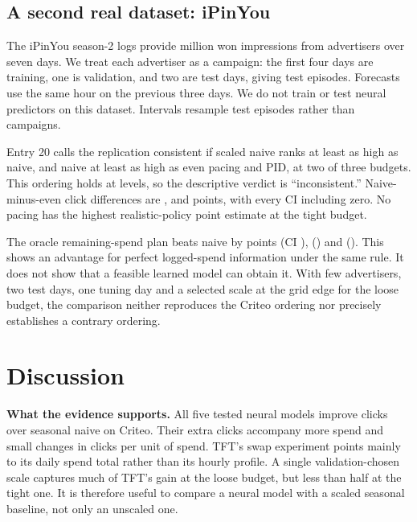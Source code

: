 \documentclass[sigconf,nonacm]{acmart}
\begin{document}
\subsection{A second real dataset: iPinYou}\label{sec:ipinyou}
The iPinYou season-2 logs provide  million won impressions
from  advertisers over seven days. We treat each advertiser
as a campaign: the first four days are training, one is validation, and two
are test days, giving  test episodes. Forecasts use the same
hour on the previous three days. We do not train or test neural predictors
on this dataset. Intervals resample test episodes rather than campaigns.

Entry 20 calls the replication consistent if scaled naive ranks at least as
high as naive, and naive at least as high as even pacing and PID, at two of
three budgets. This ordering holds at  levels, so the
descriptive verdict is ``inconsistent.'' Naive-minus-even click differences
are ,  and
 points, with every CI including zero. No pacing
has the highest realistic-policy point estimate at the tight budget.

The oracle remaining-spend plan beats naive by
 points (CI ),
 () and
 (). This shows
an advantage for perfect logged-spend information under the same rule.
It does not show that a feasible learned model can obtain it. With few
advertisers, two test days, one tuning day and a selected scale at the grid
edge for the loose budget, the comparison neither reproduces the Criteo
ordering nor precisely establishes a contrary ordering.

\section{Discussion}

\textbf{What the evidence supports.} All five tested neural models improve
clicks over seasonal naive on Criteo. Their extra clicks accompany more spend
and small changes in clicks per unit of spend. TFT's swap experiment points
mainly to its daily spend total rather than its hourly profile. A single
validation-chosen scale captures much of TFT's gain at the loose budget, but
less than half at the tight one. It is therefore useful to compare a neural
model with a scaled seasonal baseline, not only an unscaled one.
\end{document}
